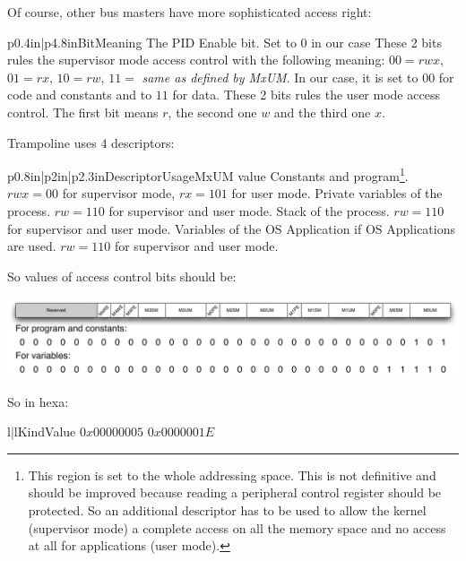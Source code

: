 Of course, other bus masters have more sophisticated access right:

\begin{longtableii}{p{0.4in}|p{4.8in}}{}{Bit}{Meaning}
  {The PID Enable bit. Set to 0 in our case}
  {These 2 bits rules the supervisor mode access control with the following meaning: $00=rwx$, $01=rx$, $10=rw$, $11=$ {\it same as defined by MxUM}. In our case, it is set to $00$ for code and constants and to $11$ for data.}
  {These 2 bits rules the user mode access control. The first bit means $r$, the second one $w$ and the third one $x$.}
\end{longtableii}

Trampoline uses 4 descriptors:

\begin{longtableiii}{p{0.8in}|p{2in}|p{2.3in}}{}{Descriptor}{Usage}{MxUM value}
  {Constants and program\footnote{This region is set to the whole addressing space. This is not definitive and should be improved because reading a peripheral control register should be protected. So an additional descriptor has to be used to allow the kernel (supervisor mode) a complete access on all the memory space and no access at all for applications (user mode).}.}
  {$rwx=00$ for supervisor mode, $rx=101$ for user mode.}
  {Private variables of the process.}
  {$rw=110$ for supervisor and user mode.}
  {Stack of the process.}
  {$rw=110$ for supervisor and user mode.}
  {Variables of the OS Application if OS Applications are used.}
  {$rw=110$ for supervisor and user mode.}
\end{longtableiii}

So values of access control bits should be:

\includegraphics[width=\textwidth]{pictures/MPUprog.pdf} 

So in hexa:

\begin{longtableii}{l|l}{}{Kind}{Value}
  {$0x00000005$}
  {$0x0000001E$}
\end{longtableii}

